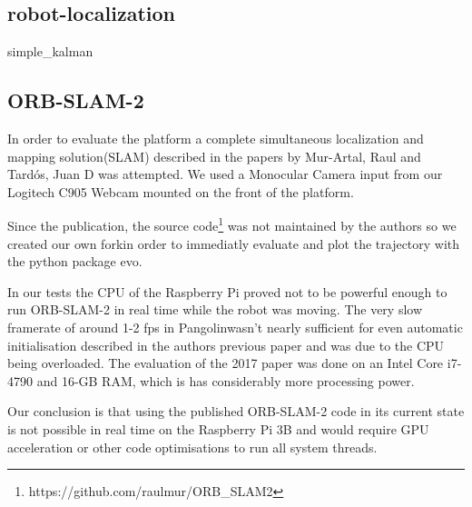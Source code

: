 \documentclass[class=article, crop=false]{standalone}
\begin{document}
\subsection{robot-localization}\label{subsec:robot-localization}

{simple_kalman}

\subsection{ORB-SLAM-2}\label{subsec:orbslam2}
In order to evaluate the platform a complete simultaneous localization and mapping solution(SLAM) described in the papers\cite{mur2015orb}\cite{mur2017orb} by Mur-Artal, Raul and Tard{\'o}s, Juan D was attempted. We used a Monocular Camera input from our Logitech C905 Webcam mounted on the front of the platform.

Since the publication, the source code\footnote{https://github.com/raulmur/ORB\_SLAM2} was not maintained by the authors so we created our own fork\footnotemark in order to immediatly evaluate and plot the trajectory with the python package evo\cite{grupp2017evo}.


In our tests the CPU of the Raspberry Pi proved not to be powerful enough to run ORB-SLAM-2 in real time while the robot was moving. The very slow framerate of around 1-2 fps in Pangolin\footnotemark wasn't nearly sufficient for even automatic initialisation described in the authors previous paper\cite{mur2015orb} and was due to the CPU being overloaded. The evaluation of the 2017 paper\cite{mur2017orb} was done on an Intel Core i7-4790 and 16-GB RAM, which is has considerably more processing power.


Our conclusion is that using the published ORB-SLAM-2 code in its current state is not possible in real time on the Raspberry Pi 3B and would require GPU acceleration or other code optimisations to run all system threads.
\end{document}
